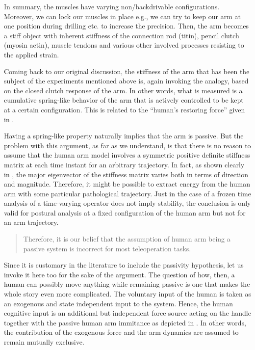 In summary, the muscles have varying non/backdrivable configurations. Moreover, we can lock our muscles in place
e.g., we can try to keep our arm at one position during drilling etc. to increase the precision. Then, the arm becomes
a stiff object with inherent stiffness of the connection rod (titin), pencil clutch (myosin actin), muscle tendons and
 various other involved processes resisting to the applied strain. 

Coming back to our original discussion, the stiffness of the arm that has been the subject of the experiments mentioned 
above is, again invoking the analogy, based on the closed clutch response of the arm. In other words, what is measured 
is a cumulative spring-like behavior of the arm that is actively controlled to be kept at a certain configuration. This 
is related to the \enquote{human's restoring force} given in . 

Having a spring-like property naturally implies that the arm is passive. But the problem with this argument, as far as 
we understand, is that there is no reason to assume that the human arm model involves a symmetric positive definite 
stiffness matrix at each time instant for an arbitrary trajectory. In fact, as shown clearly in \cite{mussa85}, the major eigenvector 
of the stiffness matrix varies both in terms of direction and magnitude. Therefore, it might be possible to extract energy 
from the human arm with some particular pathological trajectory. Just in the case of a frozen time analysis of a time-varying 
operator does not imply stability, the conclusion is only valid for postural analysis at a fixed configuration of the human arm 
but not for an arm trajectory. 

\begin{quote}
Therefore, it is our belief that the assumption of human arm being a passive system is incorrect for most teleoperation tasks.
\end{quote}
 

Since it is customary in the literature to include the passivity hypothesis, let us invoke it here too for the sake of the argument. 
The question of how, then, a human can possibly move anything while remaining passive is one that makes the whole story even more 
complicated. The voluntary input of the human is taken as an exogenous and state independent input to the system. Hence, the human 
cognitive input is an additional but independent force source acting on the handle together with the passive human arm immitance 
as depicted in . In other words, the contribution of the exogenous force and the arm dynamics are assumed 
to remain mutually exclusive. 

